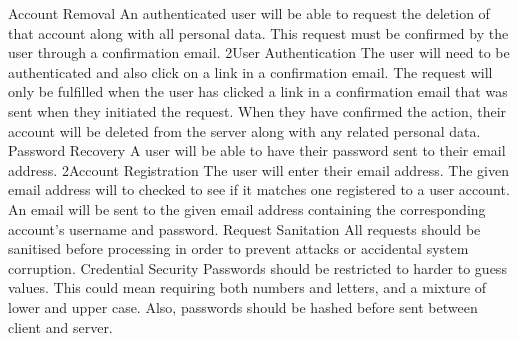 		\funcreq
			{Account Removal}
			{An authenticated user will be able to request the deletion of that account along with all personal data. This request must be confirmed by the user through a confirmation email.}
			{2}{User Authentication}
			{The user will need to be authenticated and also click on a link in a confirmation email.}
			{The request will only be fulfilled when the user has clicked a link in a confirmation email that was sent when they initiated the request.}
			{When they have confirmed the action, their account will be deleted from the server along with any related personal data.}
		\funcreq
			{Password Recovery}
			{A user will be able to have their password sent to their email address.}
			{2}{Account Registration}
			{The user will enter their email address.}
			{The given email address will to checked to see if it matches one registered to a user account.}
			{An email will be sent to the given email address containing the corresponding account's username and password.}
		\nonfuncreq
			{Request Sanitation}
			{All requests should be sanitised before processing in order to prevent attacks or accidental system corruption.}
		\nonfuncreq
			{Credential Security}
			{Passwords should be restricted to harder to guess values. This could mean requiring both numbers and letters, and a mixture of lower and upper case. Also, passwords should be hashed before sent between client and server.}
